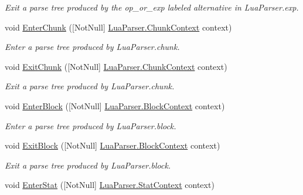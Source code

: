 \begin{DoxyCompactItemize}
\begin{DoxyCompactList}\small\item\em Exit a parse tree produced by the {\ttfamily op\+\_\+or\+\_\+exp} labeled alternative in Lua\+Parser.\+exp. \end{DoxyCompactList}\item 
void \mbox{\hyperlink{interfacezlua_1_1_i_lua_listener_ade4db31c82992f111a3093cde12fd632}{Enter\+Chunk}} (\mbox{[}Not\+Null\mbox{]} \mbox{\hyperlink{classzlua_1_1_lua_parser_1_1_chunk_context}{Lua\+Parser.\+Chunk\+Context}} context)
\begin{DoxyCompactList}\small\item\em Enter a parse tree produced by Lua\+Parser.\+chunk. \end{DoxyCompactList}\item 
void \mbox{\hyperlink{interfacezlua_1_1_i_lua_listener_ae7d177d2d81dce7f3eca3f59aeef7732}{Exit\+Chunk}} (\mbox{[}Not\+Null\mbox{]} \mbox{\hyperlink{classzlua_1_1_lua_parser_1_1_chunk_context}{Lua\+Parser.\+Chunk\+Context}} context)
\begin{DoxyCompactList}\small\item\em Exit a parse tree produced by Lua\+Parser.\+chunk. \end{DoxyCompactList}\item 
void \mbox{\hyperlink{interfacezlua_1_1_i_lua_listener_a490f8ae28bd42601f32bd54fc9058e24}{Enter\+Block}} (\mbox{[}Not\+Null\mbox{]} \mbox{\hyperlink{classzlua_1_1_lua_parser_1_1_block_context}{Lua\+Parser.\+Block\+Context}} context)
\begin{DoxyCompactList}\small\item\em Enter a parse tree produced by Lua\+Parser.\+block. \end{DoxyCompactList}\item 
void \mbox{\hyperlink{interfacezlua_1_1_i_lua_listener_aa934019f5871ef882e345518906753b7}{Exit\+Block}} (\mbox{[}Not\+Null\mbox{]} \mbox{\hyperlink{classzlua_1_1_lua_parser_1_1_block_context}{Lua\+Parser.\+Block\+Context}} context)
\begin{DoxyCompactList}\small\item\em Exit a parse tree produced by Lua\+Parser.\+block. \end{DoxyCompactList}\item 
void \mbox{\hyperlink{interfacezlua_1_1_i_lua_listener_a4d0313123030b6de6c2e4b63a00bb66f}{Enter\+Stat}} (\mbox{[}Not\+Null\mbox{]} \mbox{\hyperlink{classzlua_1_1_lua_parser_1_1_stat_context}{Lua\+Parser.\+Stat\+Context}} context)

\end{DoxyCompactItemize}
